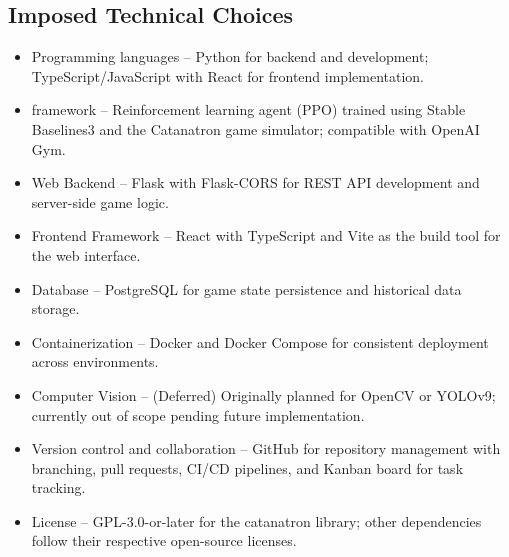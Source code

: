 \documentclass{article}
\begin{document}
\subsection{Imposed Technical Choices}\label{subsec:technicalchoices}
\begin{itemize}
    \item {Programming languages} – Python for backend and \AI{} development; TypeScript/JavaScript with React for frontend implementation.
    \item {\AI{} framework} – Reinforcement learning agent (PPO) trained using Stable Baselines3 and the Catanatron game simulator; compatible with OpenAI Gym.
    \item {Web Backend} – Flask with Flask-CORS for REST API development and server-side game logic.
    \item {Frontend Framework} – React with TypeScript and Vite as the build tool for the web interface.
    \item {Database} – PostgreSQL for game state persistence and historical data storage.
    \item {Containerization} – Docker and Docker Compose for consistent deployment across environments.
    \item {Computer Vision} – (Deferred) Originally planned for OpenCV or YOLOv9; currently out of scope pending future implementation.
    \item {Version control and collaboration} – GitHub for repository management with branching, pull requests, CI/CD pipelines, and Kanban board for task tracking.
    \item {License} – GPL-3.0-or-later for the catanatron library; other dependencies follow their respective open-source licenses.
\end{itemize}
\end{document}
